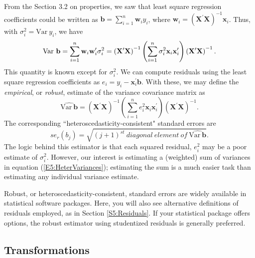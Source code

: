 From the Section 3.2 on properties, we saw that least square
regression coefficients could be written as $ \mathbf{b} =
\sum_{i=1}^n \mathbf{w}_i y_i $, where $\mathbf{w}_i =\left(
\mathbf{X}^{\prime}\mathbf{X}\right)^{-1} \mathbf{x}_i$. Thus, with
$\sigma_i^2 = \mathrm{Var~} y_i$, we have
\begin{equation}\label{E5:HeterVariances}
\mathrm{Var~}\mathbf{b} = \sum_{i=1}^n \mathbf{w}_i
\mathbf{w}_i^{\prime} \sigma_i^2  \\
=\left( \mathbf{X}^{\prime}\mathbf{X}\right)^{-1} \left(
\sum_{i=1}^n \sigma_i^2 \mathbf{x}_i \mathbf{x}_i^{\prime} \right)
\left( \mathbf{X}^{\prime}\mathbf{X}\right)^{-1}.
\end{equation}
This quantity is known except for $\sigma_i^2$. We can compute
residuals using the least square regression coefficients as $e_i =
y_i - \mathbf{x}_i^{\prime} \mathbf{b}$. With these, we may define
the \emph{empirical}, or \emph{robust}, estimate of the variance
covariance matrix as
\begin{equation*}
\widehat{\mathrm{Var~}\mathbf{b}} =\left(
\mathbf{X}^{\prime}\mathbf{X}\right)^{-1} \left( \sum_{i=1}^n e_i^2
\mathbf{x}_i \mathbf{x}_i^{\prime} \right) \left(
\mathbf{X}^{\prime}\mathbf{X}\right)^{-1}.
\end{equation*}
The corresponding ``heteroscedasticity-consistent" standard errors
are
\begin{equation}\label{E5:RobustSEs}
se_r(b_j) = \sqrt{(j+1)^{st} ~diagonal~
element~of~\widehat{\mathrm{Var~}\mathbf{b}}}.
\end{equation}
The logic behind this estimator is that each squared residual,
$e_i^2$ may be a poor estimate of $\sigma_i^2$. However, our
interest is estimating a (weighted) sum of variances in equation
(\ref{E5:HeterVariances}); estimating the sum is a much easier task
than estimating any individual variance estimate.

Robust, or heteroscedasticity-consistent, standard errors are widely
available in statistical software packages. Here, you will also see
alternative definitions of residuals employed, as in Section
\ref{S5:Residuals}. If your statistical package offers options, the
robust estimator using studentized residuals is generally preferred.


\subsection{Transformations}\label{S5:Transformations}

